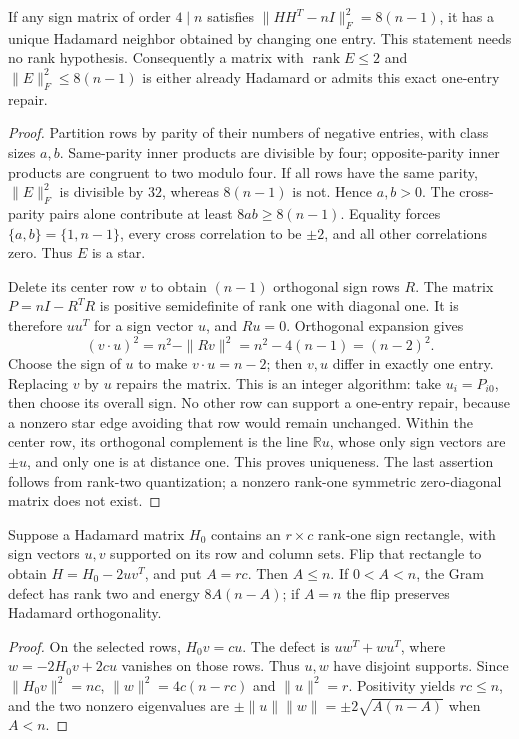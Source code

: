 \begin{theorem}
\label{thm:spectral-one-entry}
If any sign matrix of order $4\mid n$ satisfies
$\|HH^T-nI\|_F^2=8(n-1)$, it has a unique Hadamard neighbor obtained
by changing one entry. This statement needs no rank hypothesis.
Consequently a matrix with $\operatorname{rank}E\le2$ and
$\|E\|_F^2\le8(n-1)$ is either already Hadamard or admits this exact
one-entry repair.
\end{theorem}
\begin{proof}
Partition rows by parity of their numbers of negative entries, with
class sizes $a,b$. Same-parity inner products are divisible by four;
opposite-parity inner products are congruent to two modulo four.
If all rows have the same parity, $\|E\|_F^2$ is divisible by $32$,
whereas $8(n-1)$ is not. Hence $a,b>0$. The cross-parity pairs alone
contribute at least $8ab\ge8(n-1)$. Equality forces
$\{a,b\}=\{1,n-1\}$, every cross correlation to be $\pm2$, and all
other correlations zero. Thus $E$ is a star.

Delete its center row $v$ to obtain $(n-1)$ orthogonal sign rows $R$.
The matrix $P=nI-R^TR$ is positive semidefinite of rank one with diagonal
one. It is therefore $uu^T$ for a sign vector $u$, and $Ru=0$.
Orthogonal expansion gives
\[
 (v\cdot u)^2=n^2-\|Rv\|^2=n^2-4(n-1)=(n-2)^2.
\]
Choose the sign of $u$ to make $v\cdot u=n-2$; then $v,u$ differ in
exactly one entry. Replacing $v$ by $u$ repairs the matrix. This is
an integer algorithm: take $u_i=P_{i0}$, then choose its overall sign.
No other row can support a one-entry repair, because a nonzero star
edge avoiding that row would remain unchanged. Within the center row,
its orthogonal complement is the line $\mathbb Ru$, whose only sign
vectors are $\pm u$, and only one is at distance one. This proves
uniqueness. The last assertion follows from rank-two quantization;
a nonzero rank-one symmetric zero-diagonal matrix does not exist.
\end{proof}

\begin{lemma}
\label{lem:spectral-rectangle}
Suppose a Hadamard matrix $H_0$ contains an $r\times c$ rank-one sign
rectangle, with sign vectors $u,v$ supported on its row and column sets.
Flip that rectangle to obtain $H=H_0-2uv^T$, and put $A=rc$.
Then $A\le n$. If $0<A<n$, the Gram defect has rank two and energy
$8A(n-A)$; if $A=n$ the flip preserves Hadamard orthogonality.
\end{lemma}
\begin{proof}
On the selected rows, $H_0v=cu$. The defect is
$uw^T+wu^T$, where $w=-2H_0v+2cu$ vanishes on those rows.
Thus $u,w$ have disjoint supports. Since $\|H_0v\|^2=nc$,
$\|w\|^2=4c(n-rc)$ and $\|u\|^2=r$. Positivity yields $rc\le n$,
and the two nonzero eigenvalues are
$\pm\|u\|\|w\|=\pm2\sqrt{A(n-A)}$ when $A<n$.
\end{proof}

